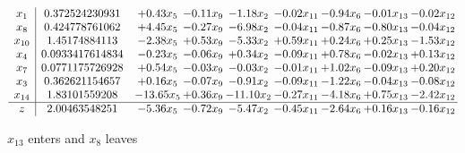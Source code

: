 \documentclass[8pt]{article}
\begin{document}
 \[\begin{array}{c| c c@{\hskip 2pt} c@{\hskip 2pt} c@{\hskip 2pt} c@{\hskip 2pt} c@{\hskip 2pt} c@{\hskip 2pt} c@{\hskip 2pt} }
 x_{1}   &  0.372524230931 & +  0.43 x_{5} & -0.11 x_{9} & -1.18 x_{2} & -0.02 x_{11} & -0.94 x_{6} & -0.01 x_{13} & -0.02 x_{12}\\
 x_{8}   &  0.424778761062 & +  4.45 x_{5} & -0.27 x_{9} & -6.98 x_{2} & -0.04 x_{11} & -0.87 x_{6} & -0.80 x_{13} & -0.04 x_{12}\\
 x_{10}   &  1.45174884113 & -2.38 x_{5} & +  0.53 x_{9} & -5.33 x_{2} & +  0.59 x_{11} & +  0.24 x_{6} & +  0.25 x_{13} & -1.53 x_{12}\\
 x_{4}   &  0.0933417614834 & -0.23 x_{5} & -0.06 x_{9} & +  0.34 x_{2} & -0.09 x_{11} & +  0.78 x_{6} & -0.02 x_{13} & +  0.13 x_{12}\\
 x_{7}   &  0.0771175726928 & +  0.54 x_{5} & -0.03 x_{9} & -0.03 x_{2} & -0.01 x_{11} & +  1.02 x_{6} & -0.09 x_{13} & +  0.20 x_{12}\\
 x_{3}   &  0.362621154657 & +  0.16 x_{5} & -0.07 x_{9} & -0.91 x_{2} & -0.09 x_{11} & -1.22 x_{6} & -0.04 x_{13} & -0.08 x_{12}\\
 x_{14}   &  1.83101559208 & -13.65 x_{5} & +  0.36 x_{9} & -11.10 x_{2} & -0.27 x_{11} & -4.18 x_{6} & +  0.75 x_{13} & -2.42 x_{12}\\
\hline
z    &  2.00463548251 & -5.36 x_{5} & -0.72 x_{9} & -5.47 x_{2} & -0.45 x_{11} & -2.64 x_{6} & +  0.16 x_{13} & -0.16 x_{12}\\
\end{array}\]


 $ x_{13} $ enters and $ x_{8} $ leaves 
\end{document}
